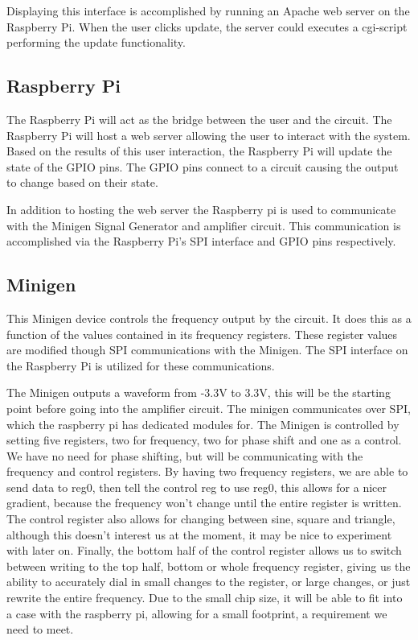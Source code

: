 \documentclass{article}	%
\begin{document}
\begin{multicols}{2}
Displaying this interface is accomplished by 
running an Apache web server on the Raspberry Pi. 
When the user clicks update, the server could executes 
a cgi-script performing the update functionality.

\subsection{Raspberry Pi}
The Raspberry Pi will act as the bridge between the user and the circuit.
The Raspberry Pi will host a web server allowing the user to interact with the system.
Based on the results of this user interaction, 
the Raspberry Pi will update the state of the GPIO pins.
The GPIO pins connect to a circuit causing the output to change based on their state. 

In addition to hosting the web server the Raspberry pi is used to
communicate with the 
Minigen Signal Generator and 
amplifier circuit.
This communication is accomplished via 
the Raspberry Pi's SPI interface and
GPIO pins respectively.

\subsection{Minigen}
This Minigen device controls the frequency output by the circuit.
It does this as a function of the values contained in its frequency registers.
These register values are modified though SPI communications with the Minigen.
The SPI interface on the Raspberry Pi is utilized for these communications.

The Minigen outputs a waveform from -3.3V to 3.3V, this will be the starting point before going into the amplifier circuit. The minigen communicates over SPI, which the raspberry pi has dedicated modules for. The Minigen is controlled by setting five registers, two for frequency, two for phase shift and one as a control. We have no need for phase shifting, but will be communicating with the frequency and control registers. By having two frequency registers, we are able to send data to reg0, then tell the control reg to use reg0, this allows for a nicer gradient, because the frequency won’t change until the entire register is written. The control register also allows for changing between sine, square and triangle, although this doesn’t interest us at the moment, it may be nice to experiment with later on. Finally, the bottom half of the control register allows us to switch between writing to the top half, bottom or whole frequency register, giving us the ability to accurately dial in small changes to the register, or large changes, or just rewrite the entire frequency. Due to the small chip size, it will be able to fit into a case with the raspberry pi, allowing for a small footprint, a requirement we need to meet.  


\end{multicols}
\end{document}
